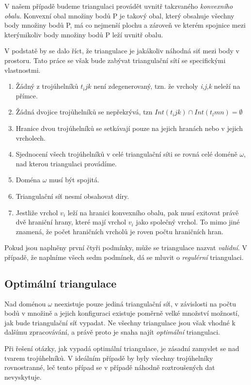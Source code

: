 \documentclass[12pt,a4paper]{article}
\begin{document}
V našem případě budeme triangulaci provádět uvnitř takzvaného \textit{konvexního obalu}. Konvexní obal množiny bodů P je takový obal, který obsahuje všechny body množiny bodů P, má co nejmenší plochu a zároveň ve kterém spojnice mezi kterýmikoliv body množiny bodů P leží uvnitř obalu.

V podstatě by se dalo říct, že triangulace je jakákoliv náhodná siť mezi body v prostoru. Tato práce se však bude zabývat triangulační sítí se specifickými vlastnostmi.


\begin{enumerate}
\item Žádný z trojúhelníků $t_ijk$ není zdegenerovaný, tzn. že vrcholy \textit{i,j,k} neleží na přímce.
\item Žádná dvojice trojůhelníků se nepřekrývá, tzn $Int(t_ijk) \cap Int(t_lmn) = \emptyset$
\item Hranice dvou trojúhelníků se setkávají pouze na jejich hranách nebo v jejich vrcholech.
\item Sjednocení všech trojúhelníků v celé triangulační síti se rovná celé doméně $\omega$, nad kterou triangulaci provádíme.
\item Doména $\omega$ musí být spojitá.
\item Triangulační síť nesmí obsahovat díry.
\item Jestliže vrchol $v_i$ leží na hranici konvexního obalu, pak musí exitovat právě dvě hraniční hrany, které mají vrchol $v_i$ jako společný vrchol. To mimo jiné znamená, že počet hraničních vrcholů je roven počtu hraničních hran.
\end{enumerate}


Pokud jsou naplněny první čtyři podmínky, může se triangulace nazvat \textit{validní}. V případě, že naplníme všech sedm podmínek, dá se mluvit o \textit{regulérní} triangulaci.


\subsection{Optimální triangulace}

Nad doménou $\omega$ neexistuje pouze jediná triangulační síť, v závislosti na počtu bodů v množině a jejich konfiguraci existuje poměrně velké množství možností, jak bude triangulační síť vypadat. Ne všechny triangulace jsou však vhodné k dalšímu zpracovávání, a právě proto je snaha najít \textit{optimální} triangulaci.

Při řešení otázky, jak vypadá optimální triangulace, je zásadní zamyslet se nad tvarem trojúhelníků. V ideálním případě by byly všechny trojúhelníky rovnostranné, leč tento případ se v případě náhodně roztroušených dat nevyskytuje.
\end{document}
